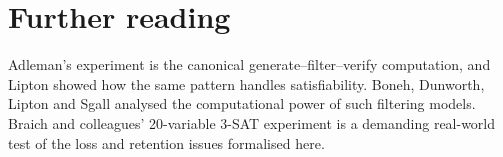 \section*{Further reading}
Adleman's experiment is the canonical generate--filter--verify
computation,\cite{Adleman1994} and Lipton showed how the same pattern handles
satisfiability.\cite{Lipton1995} Boneh, Dunworth, Lipton and Sgall analysed the
computational power of such filtering models.\cite{Boneh1996} Braich and
colleagues' 20-variable 3-SAT experiment is a demanding real-world test of the
loss and retention issues formalised here.\cite{Braich2002}
